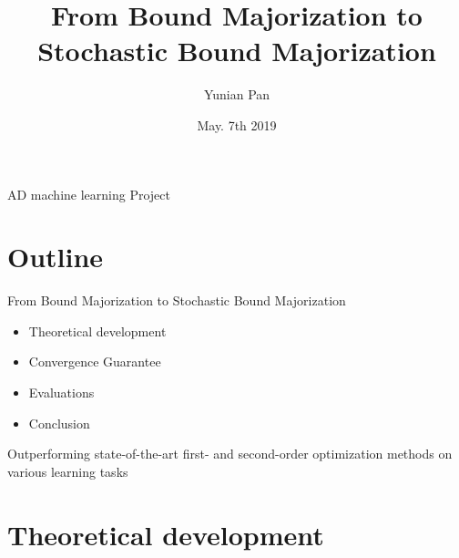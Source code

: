 \documentclass{beamer}
\title[From Bound Majorization to Stochastic Bound Majorization]{From Bound Majorization to Stochastic Bound Majorization}
\author{Yunian Pan}
\institute{ECE department}
\date{May. 7th 2019}
\begin{document}
\begin{frame}{AD machine learning Project}
  \titlepage
\end{frame}


\section{Outline}

\begin{frame}{From Bound Majorization to Stochastic Bound Majorization}

\begin{itemize}
  \item Theoretical development
  \item Convergence Guarantee
  \item Evaluations
  \item Conclusion
\end{itemize}

\vskip 1cm

\begin{block}{}
  Outperforming state-of-the-art first- and second-order
  optimization methods on various learning tasks
 \end{block}

\end{frame}

\section{Theoretical development}
\end{document}
